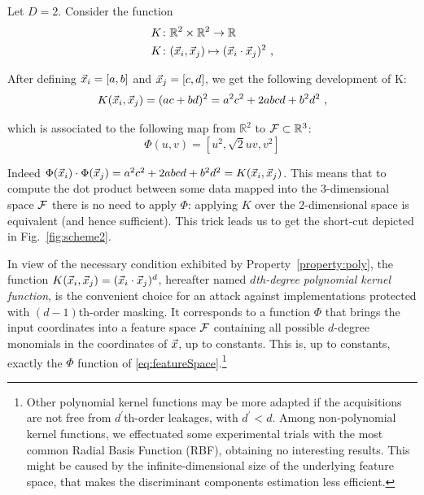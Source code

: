 \begin{example}\label{ex:polyKernel}
Let $D=2$. Consider the function
\begin{align}
&K\colon\mathbb{R}^2\times \mathbb{R}^2 \rightarrow \mathbb{R} \nonumber \\ 
&K\colon(\vec{x}_i,\vec{x}_j) \mapsto ( \vec{x}_i\cdot \vec{x}_j)^2 \mbox{ ,} \label{eq:example1}
\end{align}

After defining $\vec{x}_i = [a,b]$ and $\vec{x}_j = [c,d]$, we get the following development of K:
\begin{equation}
K(\vec{x}_i,\vec{x}_j) = (ac + bd)^2 = a^2c^2 + 2abcd + b^2d^2 \mbox{ ,}
\end{equation}

which is associated to the following map from $\mathbb{R}^2$ to $\mathcal{F} \subset\mathbb{R}^3$:
\begin{equation}
\Phi(u,v) =  [u^2, \sqrt{2}uv, v^2]
\end{equation}

Indeed $\Phi(\vec{x}_i)\cdot \Phi(\vec{x}_j) = a^2c^2 + 2abcd + b^2d^2 = K(\vec{x}_i,\vec{x}_j)$\enspace. This means that to compute the dot product between some data mapped into the $3$-dimensional space $\mathcal{F}$ there is no need to apply $\Phi$: applying $K$ over the $2$-dimensional space is equivalent (and hence sufficient). This trick leads us to get the short-cut depicted in Fig.~\ref{fig:scheme2}.

\end{example}



In view of the necessary condition exhibited by Property~\ref{property:poly},  the function $K(\vec{x}_i,\vec{x}_j) = (\vec{x}_i \cdot \vec{x}_j)^d$, hereafter named \emph{$d$th-degree polynomial kernel function}, is the convenient choice for an attack against implementations protected with $(d-1)$th-order masking. It corresponds to a function $\Phi$ that brings the input coordinates into a feature space $\mathcal{F}$ containing all possible $d$-degree monomials in the coordinates of $\vec{x}$, up to constants. This is, up to constants, exactly the $\Phi$ function of \eqref{eq:featureSpace}.\footnote{Other polynomial kernel functions may be more adapted if the acquisitions are not free from $d^\prime$th-order leakages, with $d^\prime<d$. Among non-polynomial kernel functions, we effectuated some experimental trials with the most common Radial Basis Function (RBF), obtaining no interesting results. This might be caused by the infinite-dimensional size of the underlying feature space, that makes the discriminant components estimation less efficient.}\\ 

